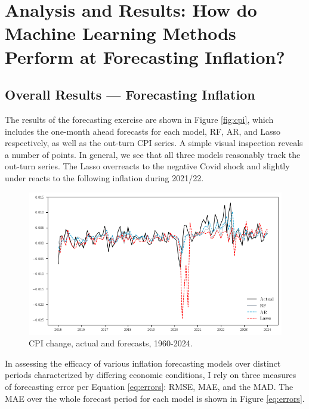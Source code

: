 \section{Analysis and Results: How do Machine Learning Methods Perform at Forecasting Inflation?} \label{sec:analysis}

\subsection{Overall Results — Forecasting Inflation} \label{sec:analysis_results}

The results of the forecasting exercise are shown in Figure \ref{fig:cpi}, which includes the one-month ahead forecasts for each model, RF, AR, and Lasso respectively, as well as the out-turn CPI series. A simple visual inspection reveals a number of points. In general, we see that all three models reasonably track the out-turn series. The Lasso overreacts to the negative Covid shock and slightly under reacts to the following inflation during 2021/22.

\begin{figure}[H]
    \centering
    \includegraphics[width=1\linewidth]{figures/forecasts.png}
    \vspace{-30pt}
    \caption{CPI change, actual and forecasts, 1960-2024.}
    \label{fig:forecasts} 
\end{figure}

In assessing the efficacy of various inflation forecasting models over distinct periods characterized by differing economic conditions, I rely on three measures of forecasting error per Equation \ref{eq:errors}: RMSE, MAE, and the MAD. The MAE over the whole forecast period for each model is shown in Figure \ref{eq:errors}.

